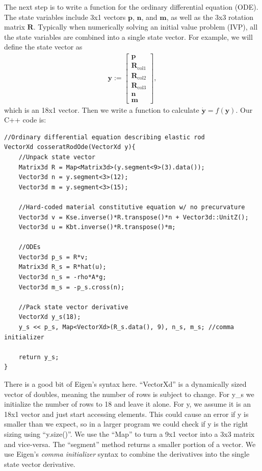 \documentclass[12pt]{article}
\begin{document}
The next step is to write a function for the ordinary differential equation (ODE). The state variables include 3x1 vectors $\boldsymbol{p}$, $\boldsymbol{n}$, and $\boldsymbol{m}$, as well as the 3x3 rotation matrix $\boldsymbol{R}$. Typically when numerically solving an initial value problem (IVP), all the state variables are combined into a single state vector. For example, we will define the state vector as
\begin{align*}
\boldsymbol{y} := \begin{bmatrix} \boldsymbol{p} \\ \boldsymbol{R}_\text{col1} \\ \boldsymbol{R}_\text{col2} \\ \boldsymbol{R}_\text{col3} \\ \boldsymbol{n} \\ \boldsymbol{m} \end{bmatrix},
\end{align*}
which is an 18x1 vector. Then we write a function to calculate $\dot{\boldsymbol{y}} = f(\boldsymbol{y})$. Our C++ code is:
\begin{lstlisting}
//Ordinary differential equation describing elastic rod
VectorXd cosseratRodOde(VectorXd y){
    //Unpack state vector
    Matrix3d R = Map<Matrix3d>(y.segment<9>(3).data());
    Vector3d n = y.segment<3>(12);
    Vector3d m = y.segment<3>(15);

    //Hard-coded material constitutive equation w/ no precurvature
    Vector3d v = Kse.inverse()*R.transpose()*n + Vector3d::UnitZ();
    Vector3d u = Kbt.inverse()*R.transpose()*m;

    //ODEs
    Vector3d p_s = R*v;
    Matrix3d R_s = R*hat(u);
    Vector3d n_s = -rho*A*g;
    Vector3d m_s = -p_s.cross(n);

    //Pack state vector derivative
    VectorXd y_s(18);
    y_s << p_s, Map<VectorXd>(R_s.data(), 9), n_s, m_s; //comma initializer

    return y_s;
}
\end{lstlisting}
There is a good bit of Eigen's syntax here. ``VectorXd'' is a dynamically sized vector of doubles, meaning the number of rows is subject to change. For y\_s we initialize the number of rows to 18 and leave it alone. For y, we assume it is an 18x1 vector and just start accessing elements. This could cause an error if y is smaller than we expect, so in a larger program we could check if y is the right sizing using ``y.size()''. We use the ``Map'' to turn a 9x1 vector into a 3x3 matrix and vice-versa. The ``segment'' method returns a smaller portion of a vector. We use Eigen's \emph{comma initializer} syntax to combine the derivatives into the single state vector derivative.
\end{document}
